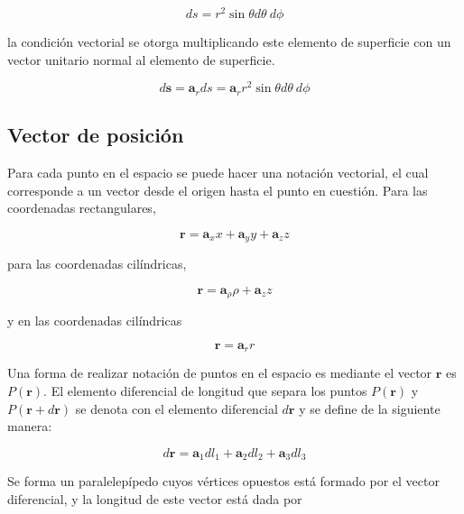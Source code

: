\begin{equation*}
ds = r^2 \sin \theta d \theta \ d \phi
\end{equation*}

la condición vectorial se otorga multiplicando este elemento de superficie con un vector unitario normal al elemento de superficie. 

\begin{equation*}
d \mathbf{s} = \mathbf{a}_{r} ds = \mathbf{a}_{r} r^2 \sin \theta d \theta \ d \phi
\end{equation*}



\subsection{Vector de posición}

Para cada punto en el espacio se puede hacer una notación vectorial, el cual corresponde a un vector desde el origen hasta el punto en cuestión. Para las coordenadas rectangulares,

\begin{equation*}
\mathbf{r} = \mathbf{a}_x x + \mathbf{a}_y y + \mathbf{a}_z z
\end{equation*}

para las coordenadas cilíndricas,

\begin{equation*}
\mathbf{r} = \mathbf{a}_{\rho} \rho + \mathbf{a}_z z
\end{equation*}

y en las coordenadas cilíndricas

\begin{equation*}
\mathbf{r} = \mathbf{a}_r r
\end{equation*}

Una forma de realizar notación de puntos en el espacio es mediante el vector $\mathbf{r}$ es $P(\mathbf{r})$. El elemento diferencial de longitud que separa los puntos $P(\mathbf{r})$ y $P(\mathbf{r} + d \mathbf{r})$ se denota con el elemento diferencial $d \mathbf{r}$ y se define de la siguiente manera:

\begin{equation*}
d \mathbf{r} = \mathbf{a}_1 d l_1 + \mathbf{a}_2 d l_2 + \mathbf{a}_3 d l_3
\end{equation*}

Se forma un paralelepípedo cuyos vértices opuestos está formado por el vector diferencial, y la longitud de este vector está dada por 

